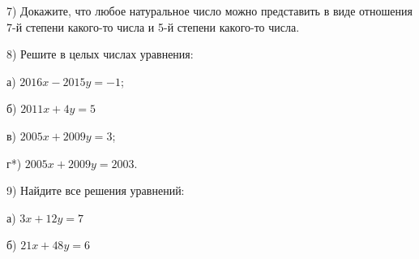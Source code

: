 \newpage

7) Докажите, что любое натуральное число можно представить в виде отношения 7-й степени какого-то числа и 5-й степени какого-то числа.

8) Решите в целых числах уравнения: 

а) $2016x - 2015y = -1$;

б) $2011x+4y=5$

в) $2005x+2009y=3$; 

г*) $2005x + 2009y = 2003$.

9) Найдите все решения уравнений:

а) $3x+12y=7$

б) $21x+48y=6$